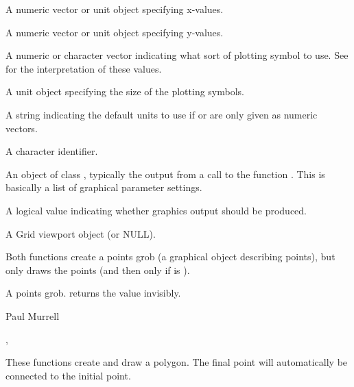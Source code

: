 \begin{Arguments}
\begin{ldescription}
\item[\code{x}] A numeric vector or unit object specifying x-values.
\item[\code{y}] A numeric vector or unit object specifying y-values.
\item[\code{pch}] A numeric or character vector indicating what sort of
plotting symbol to use.  See  for the
interpretation of these values.
\item[\code{size}] A unit object specifying the size of the plotting symbols.
\item[\code{default.units}] A string indicating the default units to use
if  or  are only given as numeric vectors. 
\item[\code{name}]  A character identifier. 
\item[\code{gp}] An object of class , typically the output
from a call to the function .  This is basically
a list of graphical parameter settings.
\item[\code{draw}] A logical value indicating whether graphics output
should be produced.
\item[\code{vp}] A Grid viewport object (or NULL).
\end{ldescription}
\end{Arguments}
%
\begin{Details}\relax
Both functions create a points grob (a graphical object describing
points), but only  draws the points (and then only
if  is ).
\end{Details}
%
\begin{Value}
A points grob.   returns the value invisibly.
\end{Value}
%
\begin{Author}\relax
Paul Murrell
\end{Author}
%
\begin{SeeAlso}\relax
{},
\end{SeeAlso}
%
\begin{Description}\relax
These functions create and draw a polygon.
The final point will automatically
be connected to the initial point.
\end{Description}
